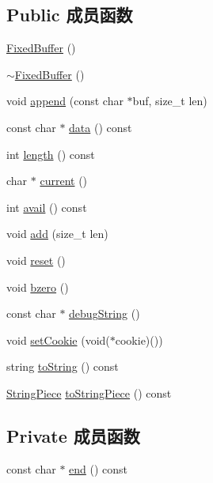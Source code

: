 \subsection*{Public 成员函数}
\begin{DoxyCompactItemize}
\item 
\hyperlink{classmuduo_1_1detail_1_1FixedBuffer_a6722d84d94a517c4b7152df4491d474f}{Fixed\+Buffer} ()
\item 
\hyperlink{classmuduo_1_1detail_1_1FixedBuffer_adde014f8d60c05f6dbf1c5ec6814121e}{$\sim$\+Fixed\+Buffer} ()
\item 
void \hyperlink{classmuduo_1_1detail_1_1FixedBuffer_a56555fde5c36cc7c4b2407916f0c0824}{append} (const char $\ast$buf, size\+\_\+t len)
\item 
const char $\ast$ \hyperlink{classmuduo_1_1detail_1_1FixedBuffer_a39a256207a84f316547e36c755373d03}{data} () const
\item 
int \hyperlink{classmuduo_1_1detail_1_1FixedBuffer_a91213974fa3ac3959b1c355a9e588f8d}{length} () const
\item 
char $\ast$ \hyperlink{classmuduo_1_1detail_1_1FixedBuffer_a3da3a484fbcb408cf19871b0e5397ab0}{current} ()
\item 
int \hyperlink{classmuduo_1_1detail_1_1FixedBuffer_a988b5e0ccd9d5681300268a2d6dfb262}{avail} () const
\item 
void \hyperlink{classmuduo_1_1detail_1_1FixedBuffer_a3993761d1c6b57cb30ceb9ae6c40eca4}{add} (size\+\_\+t len)
\item 
void \hyperlink{classmuduo_1_1detail_1_1FixedBuffer_ad20897c5c8bd47f5d4005989bead0e55}{reset} ()
\item 
void \hyperlink{classmuduo_1_1detail_1_1FixedBuffer_ae686b39fc28f49effe6f852adb778bb0}{bzero} ()
\item 
const char $\ast$ \hyperlink{classmuduo_1_1detail_1_1FixedBuffer_a8f912ff009070cb5dcce97612fcda401}{debug\+String} ()
\item 
void \hyperlink{classmuduo_1_1detail_1_1FixedBuffer_a41f8a4fce183594d93e63ea70ed1c94d}{set\+Cookie} (void($\ast$cookie)())
\item 
string \hyperlink{classmuduo_1_1detail_1_1FixedBuffer_a133cf5030cda633035ca97147356f2f9}{to\+String} () const
\item 
\hyperlink{classmuduo_1_1StringPiece}{String\+Piece} \hyperlink{classmuduo_1_1detail_1_1FixedBuffer_a78096dee3d0826efb63a5b814eef37c4}{to\+String\+Piece} () const
\end{DoxyCompactItemize}
\subsection*{Private 成员函数}
\begin{DoxyCompactItemize}
\item 
const char $\ast$ \hyperlink{classmuduo_1_1detail_1_1FixedBuffer_a8f7e2912f169cf1aa7eeaec74b5fd151}{end} () const
\end{DoxyCompactItemize}
